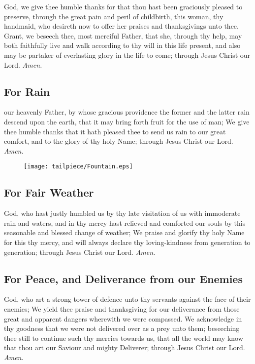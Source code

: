  God, we give thee humble thanks for that thou hast been graciously pleased to preserve, through the great pain and peril of childbirth, this woman, thy handmaid, who desireth now to offer her praises and thanksgivings unto thee. Grant, we beseech thee, most merciful Father, that she, through thy help, may both faithfully live and walk according to thy will in this life present, and also may be partaker of everlasting glory in the life to come; through Jesus Christ our Lord. \textit{Amen.}

\subsection{For Rain}
 our heavenly Father, by whose gracious providence the former and the latter rain descend upon the earth, that it may bring forth fruit for the use of man; We give thee humble thanks that it hath pleased thee to send us rain to our great comfort, and to the glory of thy holy Name; through Jesus Christ our Lord. \textit{Amen.}

\vfill

	\begin{figure}[H]
	    \centering
	    \texttt{[image: tailpiece/Fountain.eps]}
	\end{figure}

\clearpage
\subsection{For Fair Weather}
 God, who hast justly humbled us by thy late visitation of us with immoderate rain and waters, and in thy mercy hast relieved and comforted our souls by this seasonable and blessed change of weather; We praise and glorify thy holy Name for this thy mercy, and will always declare thy loving-kindness from generation to generation; through Jesus Christ our Lord. \textit{Amen.}

\subsection{For Peace, and Deliverance from our Enemies}
 God, who art a strong tower of defence unto thy servants against the face of their enemies; We yield thee praise and thanksgiving for our deliverance from those great and apparent dangers wherewith we were compassed. We acknowledge in thy goodness that we were not delivered over as a prey unto them; beseeching thee still to continue such thy mercies towards us, that all the world may know that thou art our Saviour and mighty Deliverer; through Jesus Christ our Lord. \textit{Amen.}

